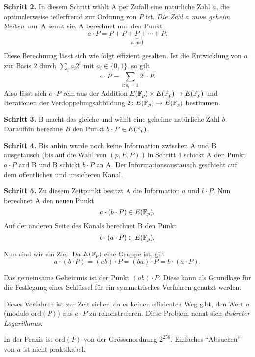 \bigskip
\textbf{Schritt 2.} In diesem Schritt wählt A per Zufall eine
natürliche Zahl $a$, die optimalerweise teilerfremd zur Ordnung von
$P$ ist. \emph{Die Zahl $a$ muss geheim bleiben}, nur A kennt sie. A berechnet nun den Punkt
$$
a\cdot P = \underbrace{P+P+P+\cdots + P}_{\text{$a$ mal}}.
$$

Diese Berechnung lässt sich wie folgt effizient gesalten.
Ist die Entwicklung von $a$ zur Basis $2$ durch $\sum_{i} a_i 2^i$ mit
$a_{i}\in \{0,1\}$, so gilt
$$
a\cdot P =\sum_{i : a_i=1} 2^i \cdot P.$$
Also lässt sich $a \cdot P$ rein aus der  Addition $E({\mathbb{F}}_p)\times
E({\mathbb{F}}_p)\rightarrow E({\mathbb{F}}_p)$  und Iterationen der
Verdoppelungsabbildung  $2\colon E({\mathbb{F}}_p)\rightarrow E({\mathbb{F}}_p)$
bestimmen. 

\bigskip
\textbf{Schritt 3.} B macht das gleiche und wählt eine geheime natürliche Zahl
$b$. Daraufhin berechne $B$ den Punkt $b\cdot P \in E({\mathbb{F}}_p)$.

\bigskip
\textbf{Schritt 4.} Bis anhin wurde noch keine Information zwischen A
und B ausgetausch (bis auf die Wahl von $(p,E,P)$.)
In Schritt 4 schickt A den Punkt $a\cdot P$ and B und B schickt
$b\cdot P$ an A. Der Informationsaustausch geschieht auf dem
öffentlichen und unsicheren Kanal. 


\bigskip
\textbf{Schritt 5.} Zu diesem Zeitpunkt besitzt A die Information $a$
und $b\cdot P$. Nun berechnet A den neuen Punkt
\begin{equation*}
  a\cdot (b\cdot P) \in E({\mathbb{F}}_p).
\end{equation*}
Auf der anderen Seite des Kanals berechnet B den Punkt
\begin{equation*}
  b\cdot (a\cdot P) \in E({\mathbb{F}}_p).
\end{equation*}

Nun sind wir am Ziel. Da $E({\mathbb{F}}_p)$ eine Gruppe ist,
gilt
$$
a\cdot (b\cdot P) = (ab)\cdot P = (ba) \cdot P = b\cdot (a\cdot P).$$

Das gemeinsame Geheimnis ist der Punkt $(ab)\cdot P$. Diese kann als
Grundlage für die Festlegung eines Schlüssel für ein symmetrisches
Verfahren genutzt werden.

Dieses Verfahren ist zur Zeit sicher, da es  keinen  effizienten Weg
gibt, den Wert $a$ (modulo $\mathrm{ord}(P)$)
aus $a\cdot P$ zu rekonstruieren. Diese Problem nennt sich
\emph{diskreter Logarithmus}.

In der Praxis ist $\mathrm{ord}(P)$
von der Grössenordnung $2^{256}$. Einfaches ``Absuchen'' von $a$ ist
nicht praktikabel.

